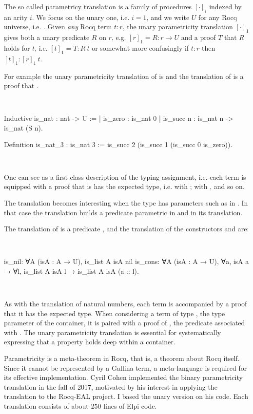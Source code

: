 \documentclass[a4paper, 11pt]{book}
\newenvironment{rocqcode}
  {\VerbatimEnvironment~\\\begin{rocqbox}\begin{xrocqcode}}{\end{xrocqcode}
\end{rocqbox}\\}
\begin{document}
The so called parametricy translation \cite{keller_et_al:LIPIcs.CSL.2012.381}
is a family of procedures $[\cdot]_i$ indexed by an arity $i$. We focus on the
unary one, i.e. $i=1$, and we write $U$ for any Rocq universe, i.e. .
Given \emph{any} Rocq term $t : r$, the unary parametricity
translation $[\cdot]_1$ gives both a unary predicate $R$ on $r$, e.g. $[r]_1 = R : r \to U$
and a proof $T$ that $R$ holds for $t$, i.e. $[t]_1 = T : R~ t$ or somewhat more
confusingly if $t : r$ then $[t]_1 : [r]_1~ t$.

For example the unary parametricity translation of
 is  and
the translation of  is a proof that .

\begin{rocqcode}
Inductive is_nat : nat -> U :=
| is_zero : is_nat 0
| is_succ n : is_nat n -> is_nat (S n).

Definition is_nat_3 : is_nat 3 :=
  is_succ 2 (is_succ 1 (is_succ 0 is_zero)).
\end{rocqcode}

One can see  as a first class description of the
typing assignment, i.e. each term is equipped with a proof that
is has the expected type, i.e.  with ;
 with , and so on.

The translation becomes interesting when the type has parameters such as
 in . In that case the translation builds
a predicate parametric in  and in its translation.

The translation of  is a predicate
,
and the translation of the constructors  and 
are:

\begin{rocqcode}
is_nil: ∀A (isA : A → U), is_list A isA nil
is_cons: ∀A (isA : A → U), ∀a, isA a → 
  ∀l, is_list A isA l → is_list A isA (a :: l).
\end{rocqcode}


As with the translation of natural numbers, each term is accompanied by a proof
that it has the expected type. When considering a term  of
type , the type parameter of the container, it is paired with a proof of
, the predicate associated with . The unary parametricity
translation is essential for systematically expressing that a property holds deep
within a container.

Parametricity is a meta-theorem in Rocq, that is, a theorem about Rocq itself.
Since it cannot be represented by a Gallina term, a meta-language is required for
its effective implementation. Cyril Cohen implemented the binary parametricity
translation in the fall of 2017, motivated by his interest in applying the
translation to the Rocq-EAL project. I based the unary version on his code. Each
translation consists of about 250 lines of Elpi code.
\end{document}
